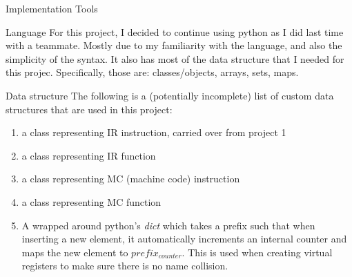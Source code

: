 \documentclass[letterpaper,12pt]{article}
\theoremstyle{definition}
\begin{document}
    \begin{section}{Implementation Tools}
        \begin{subsection}{Language}
            For this project, I decided to continue using python as I did last time with a teammate. Mostly due to my familiarity with the language, and also the simplicity of the syntax. It also has most of the data structure that I needed for this projec. Specifically, those are: classes/objects, arrays, sets, maps.
        \end{subsection}

        \begin{subsection}{Data structure}
            The following is a (potentially incomplete) list of custom data structures that are used in this project:
            \begin{enumerate}
                \item a class representing IR instruction, carried over from project 1
                \item a class representing IR function
                \item a class representing MC (machine code) instruction
                \item a class representing MC function
                \item A wrapped around python's \textit{dict} which takes a prefix such that when inserting a new element, it automatically increments an internal counter and maps the new element to \(prefix_{counter}\). This is used when creating virtual registers to make sure there is no name collision.
            \end{enumerate}


\end{subsection}
\end{section}
\end{document}
